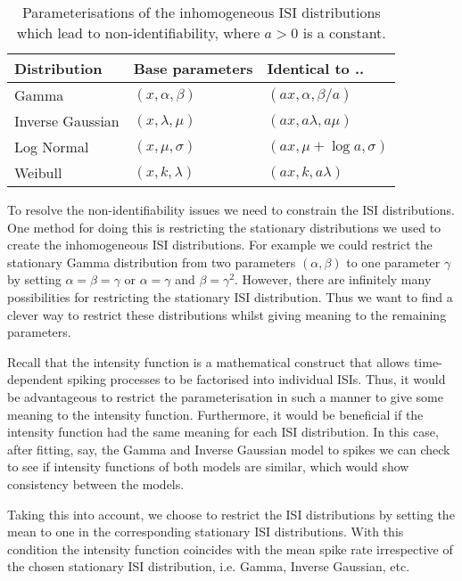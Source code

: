 \documentclass[../main.tex]{subfiles}
\begin{document}

\begin{table}[h!]
  \begin{center}
    \begin{tabular}{|l|l|l|}
    \hline
     Distribution & Base parameters & Identical to ..  \\ \hline
     Gamma & $(x, \alpha, \beta)$ & $(a x, \alpha, \beta/a)$ \\
     Inverse Gaussian & $(x,\lambda,\mu)$ & $(a x, a\lambda, a \mu)$ \\
     Log Normal & $(x,\mu, \sigma)$ & $(a x, \mu + \log a, \sigma )$ \\
     Weibull & $(x, k, \lambda)$ & $(a x, k, a \lambda)$\\ \hline
    \end{tabular}
    \caption{Parameterisations of the inhomogeneous ISI distributions which lead to non-identifiability, where $a>0$ is a constant. }
    \label{table:Non-ident}
  \end{center}
\end{table} 

To resolve the non-identifiability issues we need to constrain the ISI distributions. One method for doing this is restricting the stationary distributions we used to create the inhomogeneous ISI distributions. For example we could restrict the stationary Gamma distribution from two parameters $(\alpha, \beta)$ to one parameter $\gamma$ by setting $\alpha = \beta = \gamma $ or $\alpha =\gamma$ and $\beta =\gamma^2$. However, there are infinitely many possibilities for restricting the stationary ISI distribution. Thus we want to find a clever way to restrict these distributions whilst giving meaning to the remaining parameters.   

Recall that the intensity function is a mathematical construct that allows time-dependent spiking processes to be factorised into individual ISIs. Thus, it would be advantageous to restrict the parameterisation in such a manner to give some meaning to the intensity function. Furthermore, it would be beneficial if the intensity function had the same meaning for each ISI distribution. In this case, after fitting, say, the Gamma and Inverse Gaussian model to  spikes we can check to see if intensity functions of both models are similar, which would show consistency between the models.   

Taking this into account, we choose to restrict the ISI distributions by setting the mean to one in the corresponding stationary ISI distributions. With this condition the intensity function coincides with the mean spike rate irrespective of the chosen stationary ISI distribution, i.e. Gamma, Inverse Gaussian, etc. 
\end{document}
